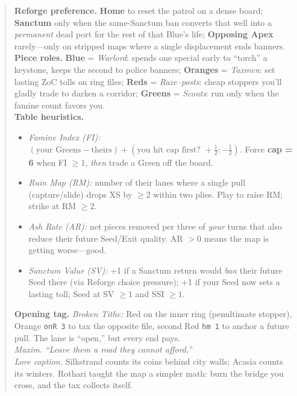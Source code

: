 \documentclass[11pt]{article}
\begin{document}
\begin{quote}
\noindent\textbf{Reforge preference.} \textbf{Home} to reset the patrol on a dense board; \textbf{Sanctum} only when the same-Sanctum ban converts that well into a \emph{permanent} dead port for the rest of that Blue’s life; \textbf{Opposing Apex} rarely—only on stripped maps where a single displacement ends banners.\\

\noindent\textbf{Piece roles.} \textbf{Blue} = \emph{Warlord}: spends one special early to “torch” a keystone, keeps the second to police banners; \textbf{Oranges} = \emph{Taxmen}: set lasting ZoC tolls on ring files; \textbf{Reds} = \emph{Raze–posts}: cheap stoppers you’ll gladly trade to darken a corridor; \textbf{Greens} = \emph{Scouts}: run only when the famine count favors you.\\[0.25em]

\noindent\textbf{Table heuristics.}
\begin{itemize}\itemsep0.2em
  \item \emph{Famine Index (FI):} $(\text{your Greens} - \text{theirs}) + (\text{you hit cap first? }+\tfrac12:-\tfrac12)$. Force \textbf{cap = 6} when FI $\ge 1$, \emph{then} trade a Green off the board.
  \item \emph{Ruin Map (RM):} number of their lanes where a single pull (capture/slide) drops XS by $\ge 2$ within two plies. Play to raise RM; strike at RM $\ge 2$.
  \item \emph{Ash Rate (AR):} net pieces removed per three of \emph{your} turns that also reduce their future Seed/Exit quality. AR $> 0$ means the map is getting worse—good.
  \item \emph{Sanctum Value (SV):} +1 if a Sanctum return would \emph{ban} their future Seed there (via Reforge choice pressure); +1 if your Seed now sets a lasting toll; Seed at SV $\ge 1$ and SSI $\ge 1$.
\end{itemize}

\noindent\textbf{Opening tag.} \emph{Broken Tithe:} Red on the inner ring (penultimate stopper), Orange \texttt{onR 3} to tax the opposite file, second Red \texttt{hm 1} to anchor a future pull. The lane is “open,” but every end pays.\\

\noindent\emph{Maxim.} \textit{“Leave them a road they cannot afford.”}\\

\noindent\textit{Lore caption.} Silkstrand counts its coins behind city walls; Acasia counts its winters. Rothari taught the map a simpler math: burn the bridge you cross, and the tax collects itself.
\clearpage



\end{quote}
\end{document}
